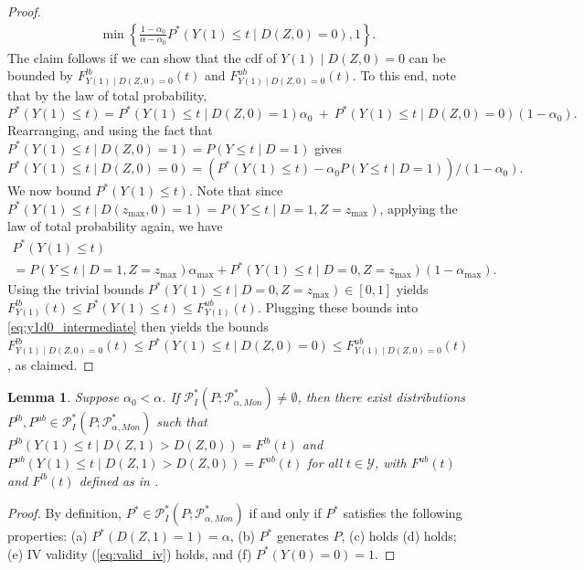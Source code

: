 \documentclass[12pt]{article}%
\newtheorem{lemma}{Lemma}
\theoremstyle{definition}
\newcommand\1{\operatorname{I}\indicatorfence}
\begin{document}
\begin{appendices}
\begin{proof}
\begin{multline*}
\min\left\{\frac{1-\alpha_{0}}{\alpha-\alpha_{0}} P^*(Y(1) \leq t \mid D(Z,0)
  =0), 1\right\}.
  \end{multline*}
  The claim follows if we can show that the cdf of $Y(1)\mid D(Z,0)=0$ can be
  bounded by $F^{lb}_{Y(1)\mid D(Z,0)=0}(t)$ and
  $F^{ub}_{Y(1)\mid D(Z,0)=0}(t)$. To this end, note that by the law of total
  probability,
  \begin{equation*}
    P^*(Y(1) \leq t) = P^*(Y(1) \leq t \mid D(Z,0)=1) \alpha_{0} \: + \: P^*(Y(1)
    \leq t \mid D(Z,0)=0) (1-\alpha_{0}).
  \end{equation*}
  Rearranging, and using the fact that
  $P^*(Y(1) \leq t \mid D(Z,0)=1)=P(Y \leq t \mid D=1)$ gives
  \begin{equation}\label{eq:y1d0_intermediate}
    P^*(Y(1) \leq t\mid D(Z,0)=0) = (P^*(Y(1) \leq t) -\alpha_{0} P(Y \leq t \mid D=1)) / (1-\alpha_{0}).
  \end{equation}
  We now bound $P^*(Y(1) \leq t)$. Note that since
  $P^*(Y(1) \leq t \mid D(z_{\max},0)=1)=P(Y \leq t\mid D=1, Z=z_{\max})$, applying the law of total probability again, we have
  \begin{multline*}
    P^*(Y(1) \leq t) \\= P(Y \leq t \mid D=1,Z=z_{\max})\alpha_{\max}
    + P^*(Y(1) \leq t \mid D=0,Z=z_{\max}) (1-\alpha_{\max}).
  \end{multline*}
  Using the trivial bounds $P^*(Y(1) \leq t \mid D=0,Z=z_{\max})\in [0,1]$
  yields $F^{lb}_{Y(1)}(t) \leq P^*(Y(1) \leq t) \leq F^{ub}_{Y(1)}(t)$.
  Plugging these bounds into \cref{eq:y1d0_intermediate} then yields the bounds
  $F^{lb}_{Y(1)\mid D(Z,0)=0}(t)\leq P^{*}(Y(1)\leq t\mid D(Z,0)=0)\leq
  F^{ub}_{Y(1)\mid D(Z,0)=0}(t)$, as claimed.
\end{proof}

\begin{lemma}\label{lemma:upper_lower_bounds_EY_D_1_tight}
  Suppose $\alpha_{0}<\alpha$. If
  $\mathcal{P}^*_{I}(P; \mathcal{P}^*_{\alpha, Mon}) \neq \emptyset$, then there
  exist distributions
  $P^{lb}, P^{ub} \in\mathcal{P}^*_{I}(P; \mathcal{P}^*_{\alpha, Mon})$ such
  that $P^{lb}(Y(1)\leq t\mid D(Z,1)>D(Z,0))=F^{lb}(t)$ and
  $P^{ub}(Y(1)\leq t\mid D(Z,1)>D(Z,0))=F^{ub}(t)$ for all $t \in \mathcal{Y}$, with $F^{ub}(t)$ and
  $F^{lb}(t)$ defined as in .
\end{lemma}
\begin{proof}
 By definition, $P^* \in \mathcal{P}^*_{I}(P; \mathcal{P}^{*}_{\alpha, Mon})$ if and only if $P^*$ satisfies the following
  properties: (a) $P^{*}(D(Z,1)=1)=\alpha$, (b) $P^{*}$ generates $P$, (c)
   holds (d)
   holds; (e) \ac{IV} validity
  (\cref{eq:valid_iv}) holds, and (f) $P^{*}(Y(0)=0)=1$.


\end{proof}
\end{appendices}
\end{document}
